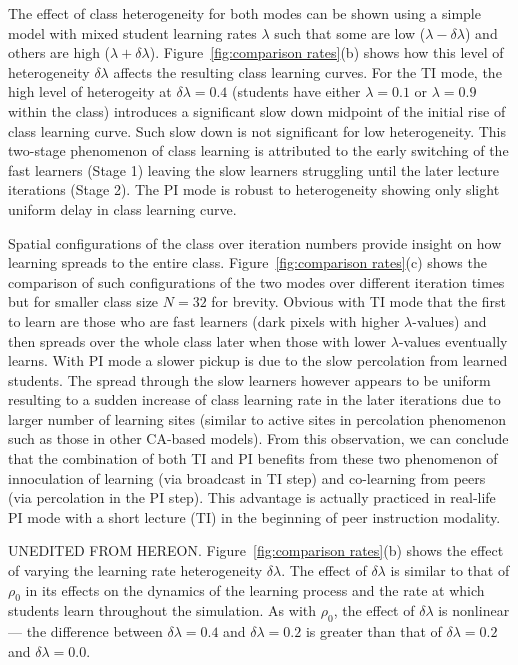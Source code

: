 \documentclass[twocolumn,secnumarabic,amssymb, nobibnotes, aps, prd]{revtex4-2}
\begin{document}
        The effect of class heterogeneity for both modes can be shown using a simple model with mixed student learning rates $\lambda$ such that some are low ($\lambda-\delta\!\lambda$) and others are high ($\lambda+\delta\!\lambda$).
        Figure~\ref{fig:comparison rates}(b) shows how this level of heterogeneity $\delta\!\lambda$ affects the resulting class learning curves.
        For the TI mode, the high level of heterogeity at $\delta\!\lambda=0.4$ (students have either $\lambda=0.1$ or $\lambda=0.9$ within the class) introduces a significant slow down midpoint of the initial rise of class learning curve.
        Such slow down is not significant for low heterogeneity.
        This two-stage phenomenon of class learning is attributed to the early switching of the fast learners (Stage 1) leaving the slow learners struggling until the later lecture iterations (Stage 2).
        The PI mode is robust to heterogeneity showing only slight uniform delay in class learning curve.
        
        Spatial configurations of the class over iteration numbers provide insight on how learning spreads to the entire class.
        Figure~\ref{fig:comparison rates}(c) shows the comparison of such configurations of the two modes over different iteration times but for smaller class size $N=32$ for brevity.
        Obvious with TI mode that the first to learn are those who are fast learners (dark pixels with higher $\lambda$-values) and then spreads over the whole class later when those with lower $\lambda$-values eventually learns.
        With PI mode a slower pickup is due to the slow percolation from learned students.
        The spread through the slow learners however appears to be uniform resulting to a sudden increase of class learning rate in the later iterations due to larger number of learning sites (similar to active sites in percolation phenomenon such as those in other CA-based models\cite{Beauchemin2005}).
        From this observation, we can conclude that the combination of both TI and PI benefits from these two phenomenon of innoculation of learning (via broadcast in TI step) and co-learning from peers (via percolation in the PI step).
        This advantage is actually practiced in real-life PI mode with a short lecture (TI) in the beginning of peer instruction modality\cite{roxas2010seating}.

        {\color{red} UNEDITED FROM HEREON.}
        Figure~\ref{fig:comparison rates}(b) shows the effect of varying the learning rate heterogeneity $\delta\lambda$.
        The effect of $\delta\lambda$ is similar to that of $\rho_0$ in its effects on the dynamics of the learning process and the rate at which students learn throughout the simulation.
        As with $\rho_0$, the effect of $\delta\lambda$ is nonlinear --- the difference between $\delta\lambda=0.4$ and $\delta\lambda=0.2$ is greater than that of $\delta\lambda=0.2$ and $\delta\lambda=0.0$.
\end{document}
